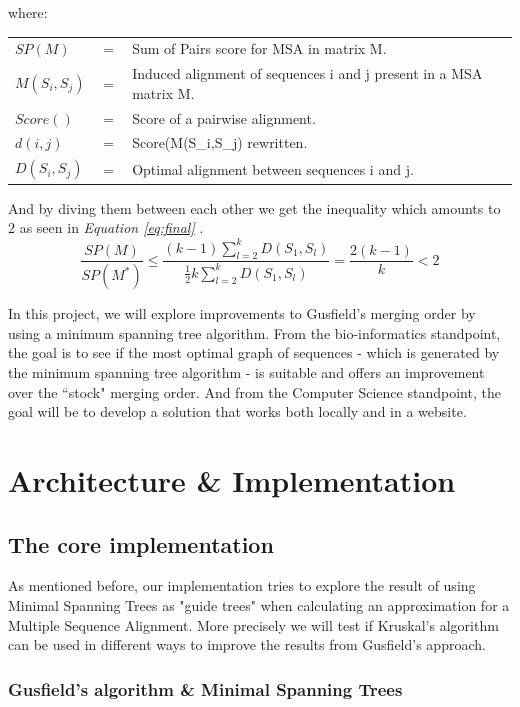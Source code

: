 \documentclass[twoside,openright,titlepage,numbers=noenddot,headinclude,%
                footinclude=true,cleardoublepage=empty,abstractoff, %
                BCOR=5mm,paper=a4,fontsize=11pt,%
                ngerman,american,%
                ]{scrreprt}
\makeatletter
\newenvironment{conditions}
  {\par\vspace{\abovedisplayskip}\noindent
   \begin{tabular}{>{$}l<{$} @{} >{${}}c<{{}$} @{} l}}
  {\end{tabular}\par\vspace{\belowdisplayskip}}
\makeatother
\begin{document}
where:

\begin{conditions}
SP(M) & = & Sum of Pairs score for MSA in matrix M. \\
 M(S_i,S_j)     & = &  Induced alignment of sequences i and j present in a MSA matrix M. \\
 Score() & = & Score of a pairwise alignment. \\ 
 d(i,j) & = & Score(M(S_i,S_j) rewritten. \\
 D(S_i,S_j) & = & Optimal alignment between sequences i and j.
\end{conditions}

And by diving them between each other we get the inequality which amounts to $2$ as seen in \textit{Equation \ref{eq:final}} \cite{fu-berlin}.
\begin{equation}\label{eq:final}
    \frac{SP(M)}{SP(M^*)}\le \frac{(k-1)\sum_{l=2}^{k}D(S_1,S_l)}{\frac{1}{2}k\sum_{l=2}^{k}D(S_1,S_l)}=\frac{2(k-1)}{k} < 2
\end{equation}
 
In this project, we will explore improvements to Gusfield's merging order by using a minimum spanning tree algorithm. From the bio-informatics standpoint, the goal is to see if the most optimal graph of sequences - which is generated by the minimum spanning tree algorithm - is suitable and offers an improvement over the ``stock" merging order. And from the Computer Science standpoint, the goal will be to develop a solution that works both locally and in a website.

\chapter{Architecture \& Implementation}
\label{cha:arch--impl}

\section{The core implementation}

As mentioned before, our implementation tries to explore the result of using Minimal Spanning Trees as "guide trees" when calculating an approximation for a Multiple Sequence Alignment. More precisely we will test if Kruskal's algorithm \cite{Kruskal1956} can be used in different ways to improve the results from Gusfield's approach.

\subsection{Gusfield's algorithm \& Minimal Spanning Trees}
\end{document}
